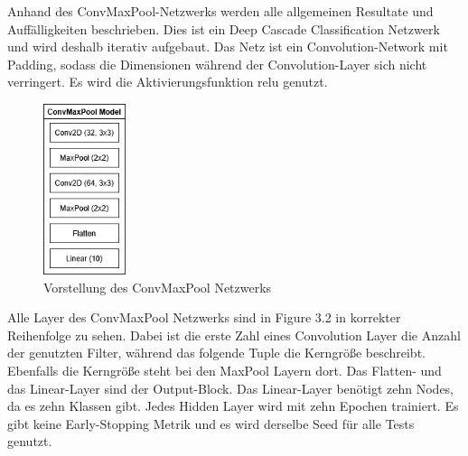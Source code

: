 Anhand des ConvMaxPool-Netzwerks werden alle allgemeinen Resultate und Auffälligkeiten beschrieben. 
Dies ist ein Deep Cascade Classification Netzwerk und wird deshalb iterativ aufgebaut. 
Das Netz ist ein Convolution-Network mit Padding, sodass die Dimensionen während der Convolution-Layer sich nicht verringert. 
Es wird die Aktivierungsfunktion relu genutzt. 

\begin{figure}[htpb]
    \includegraphics[height=5cm]{../../Graphiken/convmaxpool.png}
    \caption{\label{fig:convmaxpool} Vorstellung des ConvMaxPool Netzwerks}
\end{figure}

Alle Layer des ConvMaxPool Netzwerks sind in Figure 3.2 in korrekter Reihenfolge zu sehen. Dabei ist die erste Zahl eines Convolution Layer 
die Anzahl der genutzten Filter, während das folgende Tuple die Kerngröße beschreibt. Ebenfalls die Kerngröße steht bei den MaxPool Layern dort. 
Das Flatten- und das Linear-Layer sind der Output-Block. Das Linear-Layer benötigt zehn Nodes, da es zehn Klassen gibt. Jedes Hidden Layer wird 
mit zehn Epochen trainiert. Es gibt keine Early-Stopping Metrik und es wird derselbe Seed für alle Tests genutzt. 
